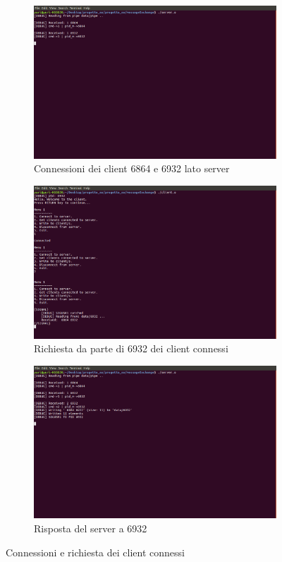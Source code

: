 \begin{figure}[H]
\centering
\begin{subfigure}[b]{0.7\textwidth}
\includegraphics[width=\textwidth]{screenmsg/5_server}
\caption{Connessioni dei client 6864 e 6932 lato server}
\end{subfigure}
\begin{subfigure}[b]{0.7\textwidth}
\includegraphics[width=\textwidth]{screenmsg/6_client_6932}
\caption{Richiesta da parte di 6932 dei client connessi}
\end{subfigure}
\begin{subfigure}[b]{0.7\textwidth}
\includegraphics[width=\textwidth]{screenmsg/7_server}
\caption{Risposta del server a 6932}
\end{subfigure}
\caption{Connessioni e richiesta dei client connessi}
\end{figure}

